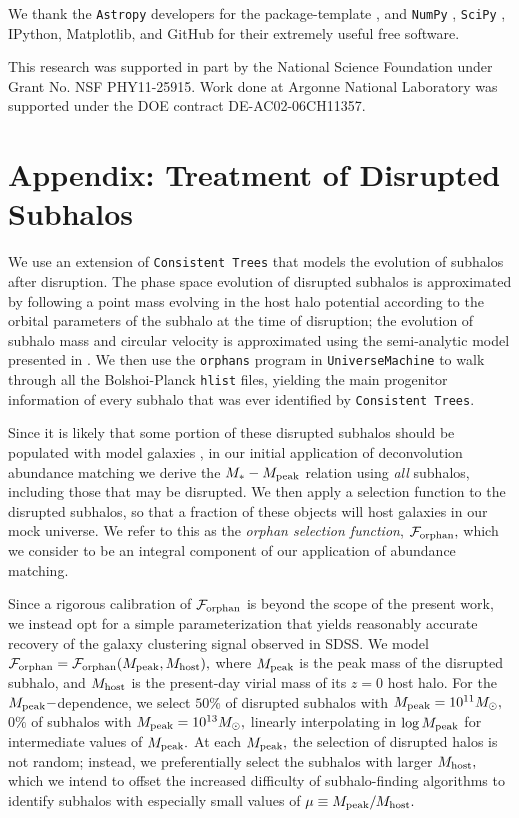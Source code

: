 \documentclass[usenatbib,usegraphicx,letterpaper]{mn2e}
\newcommand{\mstar}{M_{\ast}}
\newcommand{\mpeak}{M_{\rm peak}}
\newcommand{\mhost}{M_{\rm host}}
\newcommand{\msun}{M_\odot}
\begin{document}
We thank the {\tt Astropy} developers for the package-template \citep{astropy}, and {\tt NumPy} \citep{numpy_ndarray}, {\tt SciPy} \citep{scipy}, IPython, Matplotlib, and GitHub for their extremely useful free software.

This research was supported in part by the National Science Foundation under Grant No. NSF PHY11-25915. Work done at Argonne National Laboratory was supported under the DOE contract DE-AC02-06CH11357.



\section*{Appendix: Treatment of Disrupted Subhalos}

We use an extension of {\tt Consistent Trees} that models the evolution of subhalos after disruption. The phase space evolution of disrupted subhalos is approximated by following a point mass evolving in the host halo potential according to the orbital parameters of the subhalo at the time of disruption; the evolution of subhalo mass and circular velocity is approximated using the semi-analytic model presented in \citet{jiang_vdB14}. We then use the {\tt orphans} program in {\tt UniverseMachine} to walk through all the Bolshoi-Planck {\tt hlist} files, yielding the main progenitor information of every subhalo that was ever identified by {\tt Consistent Trees}.

Since it is likely that some portion of these disrupted subhalos should be populated with model galaxies \citep{guo_white13, campbell_etal17}, in our initial application of deconvolution abundance matching we derive the $\mstar-\mpeak$ relation using {\em all} subhalos, including those that may be disrupted. We then apply a selection function to the disrupted subhalos, so that a fraction of these objects will host galaxies in our mock universe. We refer to this as the {\em orphan selection function}, $\mathcal{F}_{\rm orphan},$ which we consider to be an integral component of our application of abundance matching.

Since a rigorous calibration of $\mathcal{F}_{\rm orphan}$ is beyond the scope of the present work, we instead opt for a simple parameterization that yields reasonably accurate recovery of the galaxy clustering signal observed in SDSS. We model $\mathcal{F}_{\rm orphan}=\mathcal{F}_{\rm orphan}(M_{\rm peak},M_{\rm host}),$ where $\mpeak$ is the peak mass of the disrupted subhalo, and $\mhost$ is the present-day virial mass of its $z=0$ host halo. For the $\mpeak-$dependence, we select $50\%$ of disrupted subhalos with $\mpeak=10^{11}\msun,$ $0\%$ of subhalos with $\mpeak=10^{13}\msun,$ linearly interpolating in $\log\mpeak$ for intermediate values of $\mpeak.$ At each $\mpeak,$ the selection of disrupted halos is not random; instead, we preferentially select the subhalos with larger $\mhost,$ which we intend to offset the increased difficulty of subhalo-finding algorithms to identify subhalos with especially small values of  $\mu\equiv\mpeak/\mhost.$
\end{document}

